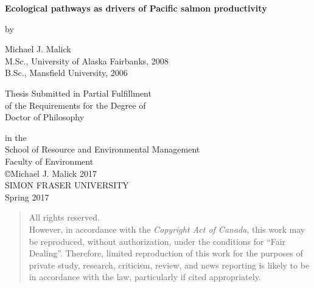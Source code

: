 


\vspace*{-11mm}
\begin{center}

\begin{spacing}{2.0}
  { \large \textbf{Ecological pathways as drivers of Pacific salmon productivity}}
\end{spacing}

\vspace{8mm}
by
\vspace{8mm}

\begin{doublespace}
Michael J. Malick  \\
M.Sc., University of Alaska Fairbanks, 2008 \\
B.Sc., Mansfield University, 2006 \\
\end{doublespace}

\vspace{10mm}
Thesis Submitted in Partial Fulfillment \\
of the Requirements for the Degree of \\

\vspace{5mm}
Doctor of Philosophy \\
\vspace{5mm}

in the \\
School of Resource and Environmental Management \\
Faculty of Environment \\

\vspace{10mm}
\copyright Michael J. Malick 2017 \\
SIMON FRASER UNIVERSITY \\
Spring 2017 \\

\vspace{15mm}
\begin{quote}
  \begin{center}
All rights reserved. \\
However, in accordance with the \emph{Copyright Act of Canada},
this work may be reproduced, without authorization, under the conditions for
``Fair Dealing''. Therefore, limited reproduction of this work for the purposes
of private study, research, criticism, review, and news reporting is likely to
be in accordance with the law, particularly if cited appropriately.
  \end{center}
\end{quote}


\end{center}

